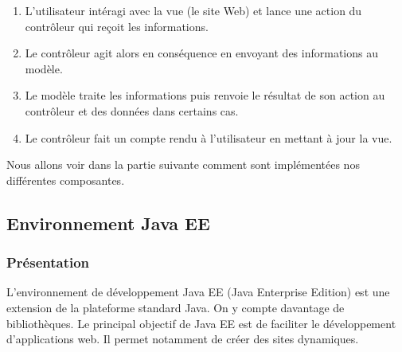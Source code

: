\begin{enumerate}
 \item L'utilisateur intéragi avec la vue (le site Web) et lance une action du contrôleur qui reçoit les informations.
 \item Le contrôleur agit alors en conséquence en envoyant des informations au modèle.
 \item Le modèle traite les informations puis renvoie le résultat de son action au contrôleur et des données dans certains cas.
 \item Le contrôleur fait un compte rendu à l'utilisateur en mettant à jour la vue.
\end{enumerate}

Nous allons voir dans la partie suivante comment sont implémentées nos différentes composantes.

\subsection{Environnement Java EE}
\subsubsection{Présentation}
L'environnement de développement Java EE (Java Enterprise Edition) est une extension de la plateforme standard Java. On y compte davantage de bibliothèques. Le principal objectif de Java EE est de faciliter le développement d'applications web. Il permet notamment de créer des sites dynamiques.\\

